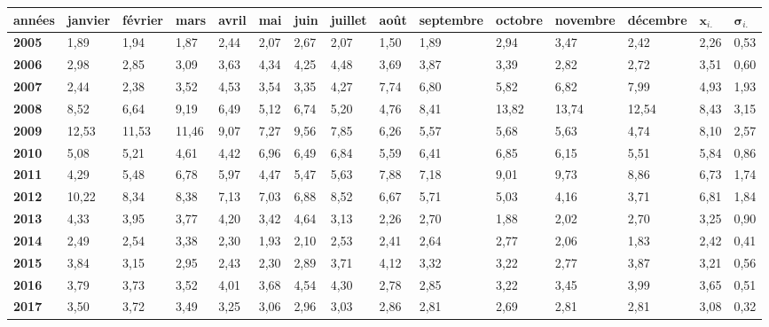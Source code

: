 \renewcommand{\arraystretch}{1.3} %
\begin{tabular}{|l|l|l|l|l|l|l|l|l|l|l|l|l|l|l|}
    \hline
    \textbf{années} & \textbf{janvier} & \textbf{février} & \textbf{mars} & \textbf{avril} & \textbf{mai} & \textbf{juin} & \textbf{juillet} & \textbf{août} & \textbf{septembre} & \textbf{octobre} & \textbf{novembre} & \textbf{décembre} & \textbf{$\bm{x}_{i.}$} & \textbf{$\bm{\sigma}_{i.}$} \\ \hline
    \textbf{2005} & 1,89 & 1,94 & 1,87 & 2,44 & 2,07 & 2,67 & 2,07 & 1,50 & 1,89 & 2,94 & 3,47 & 2,42 & 2,26 & 0,53 \\ \hline
    \textbf{2006} & 2,98 & 2,85 & 3,09 & 3,63 & 4,34 & 4,25 & 4,48 & 3,69 & 3,87 & 3,39 & 2,82 & 2,72 & 3,51 & 0,60 \\ \hline
    \textbf{2007} & 2,44 & 2,38 & 3,52 & 4,53 & 3,54 & 3,35 & 4,27 & 7,74 & 6,80 & 5,82 & 6,82 & 7,99 & 4,93 & 1,93 \\ \hline
    \textbf{2008} & 8,52 & 6,64 & 9,19 & 6,49 & 5,12 & 6,74 & 5,20 & 4,76 & 8,41 & 13,82 & 13,74 & 12,54 & 8,43 & 3,15 \\ \hline
    \textbf{2009} & 12,53 & 11,53 & 11,46 & 9,07 & 7,27 & 9,56 & 7,85 & 6,26 & 5,57 & 5,68 & 5,63 & 4,74 & 8,10 & 2,57 \\ \hline
    \textbf{2010} & 5,08 & 5,21 & 4,61 & 4,42 & 6,96 & 6,49 & 6,84 & 5,59 & 6,41 & 6,85 & 6,15 & 5,51 & 5,84 & 0,86 \\ \hline
    \textbf{2011} & 4,29 & 5,48 & 6,78 & 5,97 & 4,47 & 5,47 & 5,63 & 7,88 & 7,18 & 9,01 & 9,73 & 8,86 & 6,73 & 1,74 \\ \hline
    \textbf{2012} & 10,22 & 8,34 & 8,38 & 7,13 & 7,03 & 6,88 & 8,52 & 6,67 & 5,71 & 5,03 & 4,16 & 3,71 & 6,81 & 1,84 \\ \hline
    \textbf{2013} & 4,33 & 3,95 & 3,77 & 4,20 & 3,42 & 4,64 & 3,13 & 2,26 & 2,70 & 1,88 & 2,02 & 2,70 & 3,25 & 0,90 \\ \hline
    \textbf{2014} & 2,49 & 2,54 & 3,38 & 2,30 & 1,93 & 2,10 & 2,53 & 2,41 & 2,64 & 2,77 & 2,06 & 1,83 & 2,42 & 0,41 \\ \hline
    \textbf{2015} & 3,84 & 3,15 & 2,95 & 2,43 & 2,30 & 2,89 & 3,71 & 4,12 & 3,32 & 3,22 & 2,77 & 3,87 & 3,21 & 0,56 \\ \hline
    \textbf{2016} & 3,79 & 3,73 & 3,52 & 4,01 & 3,68 & 4,54 & 4,30 & 2,78 & 2,85 & 3,22 & 3,45 & 3,99 & 3,65 & 0,51 \\ \hline
    \textbf{2017} & 3,50 & 3,72 & 3,49 & 3,25 & 3,06 & 2,96 & 3,03 & 2,86 & 2,81 & 2,69 & 2,81 & 2,81 & 3,08 & 0,32 \\ \hline

\end{tabular}

